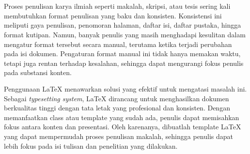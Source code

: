 %
%
%
\chapter{\Pendahuluan}


%
%
%
\section{\LatarBelakang}

Proses penulisan karya ilmiah seperti makalah, skripsi, atau tesis sering kali membutuhkan format penulisan yang baku dan konsisten. Konsistensi ini meliputi gaya penulisan, penomoran halaman, daftar isi, daftar pustaka, hingga format kutipan. Namun, banyak penulis yang masih menghadapi kesulitan dalam mengatur format tersebut secara manual, terutama ketika terjadi perubahan pada isi dokumen. Pengaturan format manual ini tidak hanya memakan waktu, tetapi juga rentan terhadap kesalahan, sehingga dapat mengurangi fokus penulis pada substansi konten.

Penggunaan LaTeX menawarkan solusi yang efektif untuk mengatasi masalah ini. Sebagai \textit{typesetting system}, LaTeX dirancang untuk menghasilkan dokumen berkualitas tinggi dengan tata letak yang profesional dan konsisten. Dengan memanfaatkan class atau template yang sudah ada, penulis dapat memisahkan fokus antara konten dan presentasi. Oleh karenanya, dibuatlah template LaTeX yang dapat mempermudah proses penulisan makalah, sehingga penulis dapat lebih fokus pada isi tulisan dan penelitian yang dilakukan.

%
%
%
\section{\RumusanMasalahPoin}

